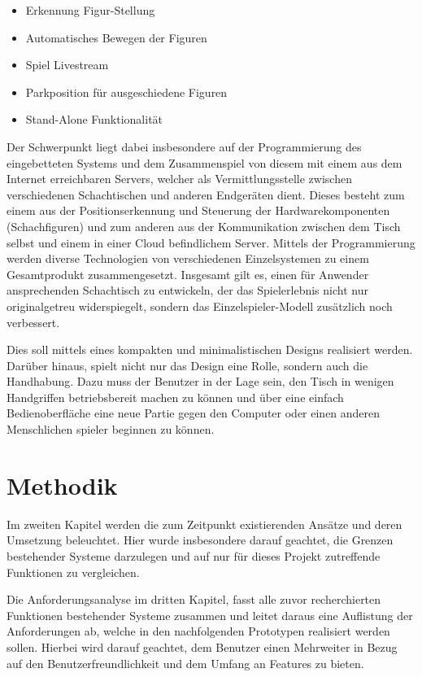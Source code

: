 \begin{itemize}
\tightlist
\item
  Erkennung Figur-Stellung
\item
  Automatisches Bewegen der Figuren
\item
  Spiel Livestream
\item
  Parkposition für ausgeschiedene Figuren
\item
  Stand-Alone Funktionalität
\end{itemize}

Der Schwerpunkt liegt dabei insbesondere auf der Programmierung des
eingebetteten Systems und dem Zusammenspiel von diesem mit einem aus dem
Internet erreichbaren Servers, welcher als Vermittlungsstelle zwischen
verschiedenen Schachtischen und anderen Endgeräten dient. Dieses besteht
zum einem aus der Positionserkennung und Steuerung der
Hardwarekomponenten (Schachfiguren) und zum anderen aus der
Kommunikation zwischen dem Tisch selbst und einem in einer Cloud
befindlichem Server. Mittels der Programmierung werden diverse
Technologien von verschiedenen Einzelsystemen zu einem Gesamtprodukt
zusammengesetzt. Insgesamt gilt es, einen für Anwender ansprechenden
Schachtisch zu entwickeln, der das Spielerlebnis nicht nur
originalgetreu widerspiegelt, sondern das Einzelspieler-Modell
zusätzlich noch verbessert.

Dies soll mittels eines kompakten und minimalistischen Designs
realisiert werden. Darüber hinaus, spielt nicht nur das Design eine
Rolle, sondern auch die Handhabung. Dazu muss der Benutzer in der Lage
sein, den Tisch in wenigen Handgriffen betriebsbereit machen zu können
und über eine einfach Bedienoberfläche eine neue Partie gegen den
Computer oder einen anderen Menschlichen spieler beginnen zu können.

\hypertarget{methodik}{%
\section{Methodik}\label{methodik}}

Im zweiten Kapitel werden die zum Zeitpunkt existierenden Ansätze und
deren Umsetzung beleuchtet. Hier wurde insbesondere darauf geachtet, die
Grenzen bestehender Systeme darzulegen und auf nur für dieses Projekt
zutreffende Funktionen zu vergleichen.

Die Anforderungsanalyse im dritten Kapitel, fasst alle zuvor
recherchierten Funktionen bestehender Systeme zusammen und leitet daraus
eine Auflistung der Anforderungen ab, welche in den nachfolgenden
Prototypen realisiert werden sollen. Hierbei wird darauf geachtet, dem
Benutzer einen Mehrweiter in Bezug auf den Benutzerfreundlichkeit und
dem Umfang an Features zu bieten.

